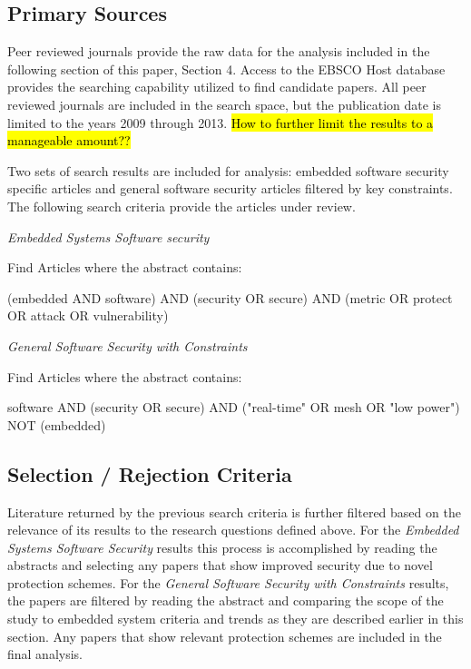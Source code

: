 \documentclass[final,conference,10pt]{IEEEtran}
\begin{document}
\subsection{Primary Sources}

Peer reviewed journals provide the raw data for the analysis included in the following section of this paper, Section 4.  Access to the EBSCO Host database provides the searching capability utilized to find candidate papers.  All peer reviewed journals are included in the search space, but the publication date is limited to the years 2009 through 2013.  \hl{How to further limit the results to a manageable amount??}

Two sets of search results are included for analysis: embedded software security specific articles and general software security articles filtered by key constraints.  The following search criteria provide the articles under review. 

\textit{Embedded Systems Software security}

Find Articles where the abstract contains:
\begin{center}
(embedded AND software) AND (security OR secure) AND (metric OR protect OR attack OR vulnerability)
\end{center}

\textit{General Software Security with Constraints}

Find Articles where the abstract contains:
\begin{center}
software AND (security OR secure) AND ("real-time" OR mesh OR "low power") NOT (embedded)
\end{center}

\subsection{Selection / Rejection Criteria}

Literature returned by the previous search criteria is further filtered based on the relevance of its results to the research questions defined above.  For the \textit{Embedded Systems Software Security} results this process is accomplished by reading the abstracts and selecting any papers that show improved security due to novel protection schemes. For the \textit{General Software Security with Constraints} results, the papers are filtered by reading the abstract and comparing the scope of the study to embedded system criteria and trends as they are described earlier in this section. Any papers that show relevant protection schemes are included in the final analysis.
\end{document}
